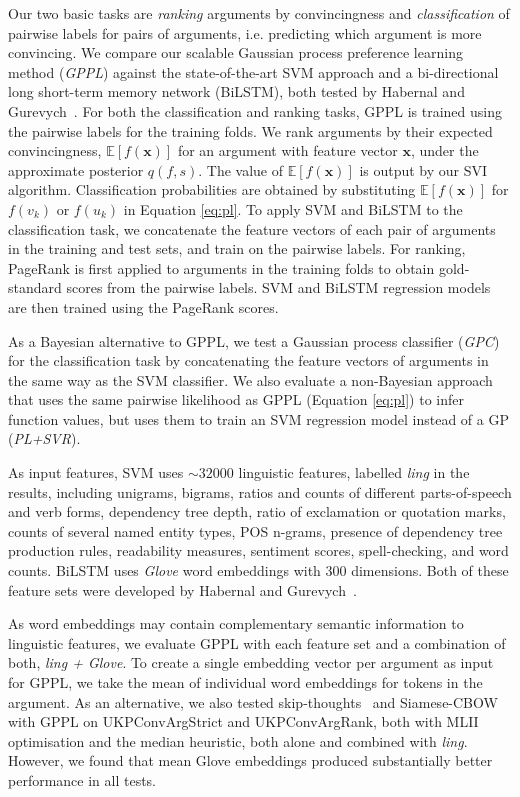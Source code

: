 Our two basic tasks are \emph{ranking} arguments by convincingness and  
\emph{classification} of pairwise labels for pairs of arguments, i.e. predicting which argument is more convincing. 
We compare our scalable Gaussian process preference learning method (\emph{GPPL}) against 
the state-of-the-art SVM approach and a bi-directional long short-term memory network (BiLSTM),
both tested by Habernal and Gurevych~.
For both the classification and ranking tasks, GPPL is trained using the pairwise labels for the training folds.
We rank arguments by their expected convincingness, $\mathbb{E}[f(\mathbf{x})]$ for an argument 
with feature vector $\mathbf{x}$, under the approximate posterior $q(f,s)$.
The value of $\mathbb{E}[f(\mathbf{x})]$ is output by our SVI algorithm.
Classification probabilities are obtained by substituting $\mathbb{E}[f(\mathbf{x})]$ for 
$f(v_k)$ or $f(u_k)$ in Equation \ref{eq:pl}.
To apply SVM and BiLSTM to the classification task, we concatenate the feature vectors of each pair of arguments in the training and test sets, and train on the pairwise labels.
For ranking, PageRank is first applied to arguments in the training folds to obtain gold-standard scores from the pairwise labels. SVM and BiLSTM regression models are then trained using the PageRank scores.

As a Bayesian alternative to GPPL, 
we test a Gaussian process classifier (\emph{GPC}) for the classification task 
by concatenating the feature vectors of arguments in the same way as the SVM classifier.
We also evaluate a non-Bayesian approach that uses the same pairwise likelihood as GPPL
(Equation \ref{eq:pl}) to infer function values, 
but uses them to train an SVM regression model instead of a GP (\emph{PL+SVR}).

As input features, SVM uses $\sim32000$ linguistic features, labelled \emph{ling} in the results, 
including unigrams, bigrams, ratios and counts of different parts-of-speech and verb forms,
dependency tree depth, ratio of exclamation or quotation marks, 
counts of several named entity types, POS n-grams,
presence of dependency tree production rules, readability measures,
sentiment scores, spell-checking, and word counts.
BiLSTM uses \emph{Glove} word embeddings with 300 dimensions. Both of these feature sets were
developed by Habernal and Gurevych~.

As word embeddings may contain complementary semantic information to linguistic features,
we evaluate GPPL with each feature set and a combination of both, \emph{ling + Glove}.
To create a single embedding vector per argument as input for GPPL,
we take the mean of individual word embeddings for tokens in the argument.
As an alternative,
we also tested skip-thoughts~\cite{kiros2015skip} and Siamese-CBOW~\cite{kenter2016siamesecbow} 
with GPPL on UKPConvArgStrict and UKPConvArgRank, both with MLII optimisation and the median heuristic,
 both alone and combined with \emph{ling}. 
However, we found that mean Glove embeddings produced substantially better performance in all tests.

